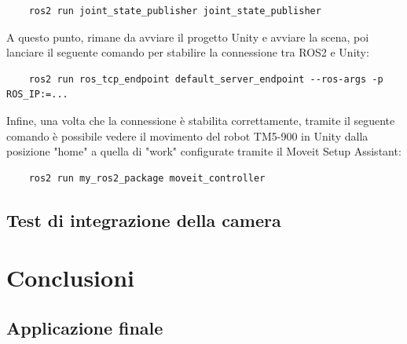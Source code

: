 \documentclass[11pt]{report}
\begin{document}
\begin{verbatim}
    ros2 run joint_state_publisher joint_state_publisher
\end{verbatim}

A questo punto, rimane da avviare il progetto Unity e avviare la scena, poi lanciare il seguente comando per stabilire la connessione tra ROS2 e Unity:
\begin{verbatim}
    ros2 run ros_tcp_endpoint default_server_endpoint --ros-args -p ROS_IP:=... 
\end{verbatim}

Infine, una volta che la connessione è stabilita correttamente, tramite il seguente comando è possibile vedere il movimento del robot TM5-900 in Unity dalla posizione "home" a quella di "work" configurate tramite il Moveit Setup Assistant:

\begin{verbatim}
    ros2 run my_ros2_package moveit_controller
\end{verbatim}


\section{Test di integrazione della camera}
\label{sec:Test_camera} 


\chapter{Conclusioni}
\label{cap:Conclusioni}

\section{Applicazione finale}


\end{document}
